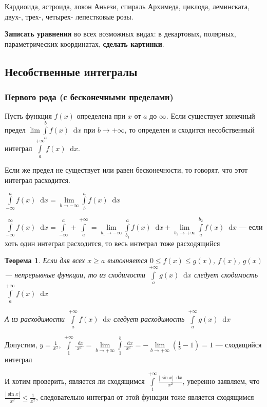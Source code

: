 \documentclass{article}
\newcommand*\diff{\mathop{}\!\mathrm{d}}
\newtheorem{theorem}{Теорема}
\begin{document}
Кардиоида, астроида, локон Аньези, спираль Архимеда, циклода, леминската, двух-, трех-, четырех- лепестковые розы.

\textbf{Записать уравнения} во всех возможных видах: в декартовых, полярных, параметрических координатах, \textbf{сделать картинки}.

\subsection{Несобственные интегралы}

\subsubsection{Первого рода (с бесконечными пределами)}

Пусть функция $f(x)$ определена при $x$ от $a$ до $\infty$. Если существует конечный предел $\lim \int\limits_{a}^{b} f(x) \diff x$ при $b \to +\infty$, то определен и сходится несобственный интеграл $\int \limits_{a}^{+\infty} f(x) \diff x$.

Если же предел не существует или равен бесконечности, то говорят, что этот интеграл расходится.

\hfill

$\int\limits_{-\infty}^{a} f(x) \diff x = \lim\limits_{b \to -\infty} \int\limits_{b}^{a} f(x) \diff x$

$\int\limits_{-\infty}^{\infty} f(x) \diff x = \int\limits_{-\infty}^{a} + \int\limits_{a}^{+\infty} = \lim\limits_{b_1 \to -\infty} \int\limits_{b_1}^{a} f(x) \diff x + \lim\limits_{b_2 \to +\infty} \int\limits_{a}^{b_2} f(x) \diff x$ — если хоть один интеграл расходится, то весь интеграл тоже расходящийся


\begin{theorem}
    Если для всех $x \ge a$ выполняется $0 \le f(x) \le g(x)$, $f(x)$, $g(x)$ — непрерывные функции, то из сходимости $\int\limits_{a}^{+\infty} g(x) \diff x$ следует сходимость $\int\limits_{a}^{+\infty} f(x) \diff x$

    А из расходимости $\int\limits_{a}^{+\infty} f(x) \diff x$ следует расходимость $\int\limits_{a}^{+\infty} g(x) \diff x$
\end{theorem}

Допустим, $y = \frac{1}{x^2}$, $\int\limits_{1}^{+\infty} \frac{\diff x}{x^2} = \lim\limits_{b \to +\infty} \int\limits_{1}^{b} \frac{\diff x}{x^2} = -\lim\limits_{b \to +\infty} (\frac{1}{b} - 1) = 1$ — сходящийся интеграл

И хотим проверить, является ли сходящимся $\int\limits_{1}^{+\infty} \frac{|\sin x| \diff x}{x^2}$, уверенно заявляем, что $\frac{|\sin x|}{x^2} \le \frac{1}{x^2}$, следовательно интеграл от этой функции тоже является сходящимся
\end{document}
